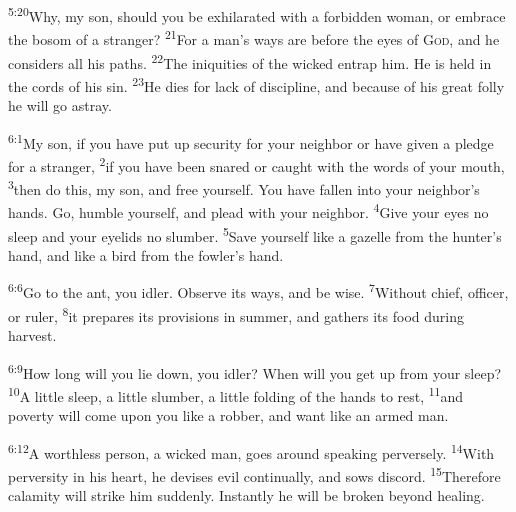 \documentclass[openany,12pt,english]{book}
\newenvironment{para}{\par\pretolerance=100\tolerance=200\setlength{\emergencystretch}{0.6em}\relax}{\par}
\begin{document}
\begin{para}
    \textsuperscript{5:20}\thinspace{}Why, my son, should you be ex\-hil\-a\-rat\-ed with a for\-bid\-den wom\-an, or em\-brace the bos\-om of a strang\-er?
    \textsuperscript{21}\thinspace{}For a man's ways are be\-fore the eyes of \textsc{God}, and he considers all his paths.
    \textsuperscript{22}\thinspace{}The iniquities of the wick\-ed en\-trap him. He is held in the cords of his sin.
    \textsuperscript{23}\thinspace{}He dies for lack of dis\-ci\-pline, and be\-cause of his great fol\-ly he will go a\-stray.
\end{para}

\bigskip{}

\begin{para}
    \textsuperscript{6:1}\thinspace{}My son, if you have put up se\-cu\-ri\-ty for your neigh\-bor or have giv\-en a pledge for a strang\-er,
    \textsuperscript{2}\thinspace{}if you have been snared or caught with the words of your mouth,
    \textsuperscript{3}\thinspace{}then do this, my son, and free your\-self. You have fall\-en in\-to your neighbor's hands. Go, hum\-ble your\-self, and plead with your neigh\-bor.
    \textsuperscript{4}\thinspace{}Give your eyes no sleep and your eyelids no slum\-ber.
    \textsuperscript{5}\thinspace{}Save your\-self like a ga\-zelle from the hunter's hand, and like a bird from the fowler's hand.
\end{para}

\begin{para}
    \textsuperscript{6:6}\thinspace{}Go to the ant, you i\-dler. Ob\-serve its ways, and be wise.
    \textsuperscript{7}\thinspace{}With\-out chief, of\-fic\-er, or rul\-er,
    \textsuperscript{8}\thinspace{}it prepares its provisions in sum\-mer, and gathers its food dur\-ing har\-vest.
\end{para}

\begin{para}
    \textsuperscript{6:9}\thinspace{}How long will you lie down, you i\-dler? When will you get up from your sleep?
    \textsuperscript{10}\thinspace{}A lit\-tle sleep, a lit\-tle slum\-ber, a lit\-tle folding of the hands to rest,
    \textsuperscript{11}\thinspace{}and pov\-er\-ty will come up\-on you like a rob\-ber, and want like an armed man.
\end{para}

\begin{para}
    \textsuperscript{6:12}\thinspace{}A worth\-less per\-son, a wick\-ed man, goes a\-round speak\-ing per\-verse\-ly.
    \textsuperscript{14}\thinspace{}With per\-ver\-si\-ty in his heart, he devises evil con\-tin\-u\-al\-ly, and sows dis\-cord.
    \textsuperscript{15}\thinspace{}There\-fore ca\-lam\-i\-ty will strike him sud\-den\-ly. In\-stant\-ly he will be bro\-ken be\-yond heal\-ing.
\end{para}
\end{document}

